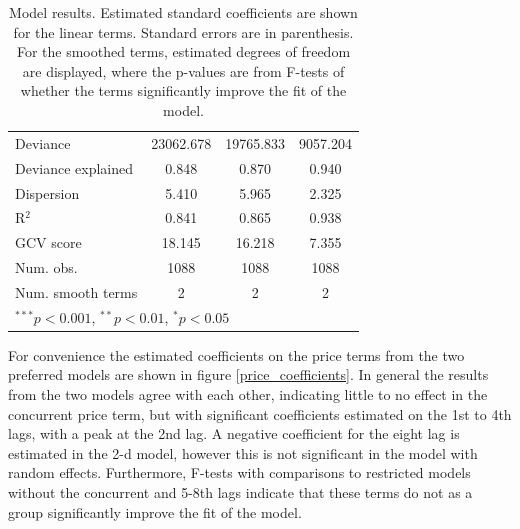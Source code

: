 \documentclass[11pt]{article}
\begin{document}
\begin{table}
\begin{center}
\begin{tabular}{l c c c }
\hline
Deviance                                     & 23062.678      & 19765.833      & 9057.204         \\
Deviance explained                           & 0.848          & 0.870          & 0.940            \\
Dispersion                                   & 5.410          & 5.965          & 2.325            \\
R$^2$                                        & 0.841          & 0.865          & 0.938            \\
GCV score                                    & 18.145         & 16.218         & 7.355            \\
Num. obs.                                    & 1088           & 1088           & 1088             \\
Num. smooth terms                            & 2              & 2              & 2                \\
\hline
\multicolumn{4}{l}{\scriptsize{$^{***}p<0.001$, $^{**}p<0.01$, $^*p<0.05$}}
\end{tabular}
\caption{Model results. Estimated standard coefficients are shown for the linear terms. Standard errors are in parenthesis. For the smoothed terms, estimated degrees of freedom are displayed, where the p-values are from F-tests of whether the terms significantly improve the fit of the model.}
\label{GAM_model_table}
\end{center}
\end{table}
 
For convenience the estimated coefficients on the price terms from the two preferred models are shown in figure \ref{price_coefficients}. In general the results from the two models agree with each other, indicating little to no effect in the concurrent price term, but with significant coefficients estimated on the 1st to 4th lags, with a peak at the 2nd lag. A negative coefficient for the eight lag is estimated in the 2-d model, however this is not significant in the model with random effects. Furthermore, F-tests with comparisons to restricted models without the concurrent and 5-8th lags indicate that these terms do not as a group significantly improve the fit of the model.
\end{document}
